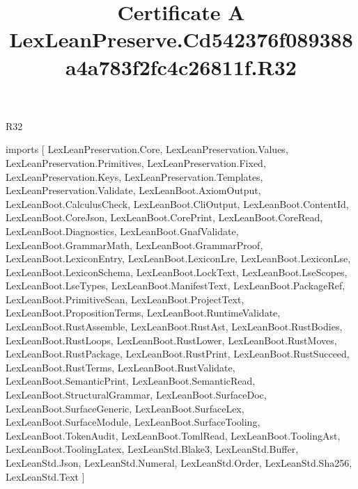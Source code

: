 \begin{lexlean}{R32}
\title{Certificate A LexLeanPreserve.Cd542376f089388a4a783f2fc4c26811f.R32}
\begin{coremodule}
imports [
  LexLeanPreservation.Core,
  LexLeanPreservation.Values,
  LexLeanPreservation.Primitives,
  LexLeanPreservation.Fixed,
  LexLeanPreservation.Keys,
  LexLeanPreservation.Templates,
  LexLeanPreservation.Validate,
  LexLeanBoot.AxiomOutput,
  LexLeanBoot.CalculusCheck,
  LexLeanBoot.CliOutput,
  LexLeanBoot.ContentId,
  LexLeanBoot.CoreJson,
  LexLeanBoot.CorePrint,
  LexLeanBoot.CoreRead,
  LexLeanBoot.Diagnostics,
  LexLeanBoot.GnafValidate,
  LexLeanBoot.GrammarMath,
  LexLeanBoot.GrammarProof,
  LexLeanBoot.LexiconEntry,
  LexLeanBoot.LexiconLre,
  LexLeanBoot.LexiconLse,
  LexLeanBoot.LexiconSchema,
  LexLeanBoot.LockText,
  LexLeanBoot.LseScopes,
  LexLeanBoot.LseTypes,
  LexLeanBoot.ManifestText,
  LexLeanBoot.PackageRef,
  LexLeanBoot.PrimitiveScan,
  LexLeanBoot.ProjectText,
  LexLeanBoot.PropositionTerms,
  LexLeanBoot.RuntimeValidate,
  LexLeanBoot.RustAssemble,
  LexLeanBoot.RustAst,
  LexLeanBoot.RustBodies,
  LexLeanBoot.RustLoops,
  LexLeanBoot.RustLower,
  LexLeanBoot.RustMoves,
  LexLeanBoot.RustPackage,
  LexLeanBoot.RustPrint,
  LexLeanBoot.RustSucceed,
  LexLeanBoot.RustTerms,
  LexLeanBoot.RustValidate,
  LexLeanBoot.SemanticPrint,
  LexLeanBoot.SemanticRead,
  LexLeanBoot.StructuralGrammar,
  LexLeanBoot.SurfaceDoc,
  LexLeanBoot.SurfaceGeneric,
  LexLeanBoot.SurfaceLex,
  LexLeanBoot.SurfaceModule,
  LexLeanBoot.SurfaceTooling,
  LexLeanBoot.TokenAudit,
  LexLeanBoot.TomlRead,
  LexLeanBoot.ToolingAst,
  LexLeanBoot.ToolingLatex,
  LexLeanStd.Blake3,
  LexLeanStd.Buffer,
  LexLeanStd.Json,
  LexLeanStd.Numeral,
  LexLeanStd.Order,
  LexLeanStd.Sha256,
  LexLeanStd.Text
]


\end{coremodule}
\end{lexlean}
